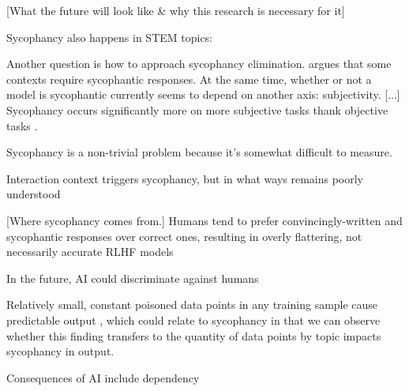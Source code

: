 \documentclass[11pt]{article}
\begin{document}
[What the future will look like \& why this research is necessary for it]

Sycophancy also happens in STEM topics: \citep{petrov2025}

Another question is how to approach sycophancy elimination. \citep{noshin2026} argues that some contexts require sycophantic responses. At the same time, whether or not a model is sycophantic currently seems to depend on another axis: subjectivity. [...] Sycophancy occurs significantly more on more subjective tasks thank objective tasks \citep{ranaldi2025}. 

Sycophancy is a non-trivial problem because it's somewhat difficult to measure.

Interaction context triggers sycophancy, but in what ways remains poorly understood \citep{jain2025}

[Where sycophancy comes from.]
Humans tend to prefer convincingly-written and sycophantic responses over correct ones, resulting in overly flattering, not necessarily accurate RLHF models \citep{sharma2025}

In the future, AI could discriminate against humans \citep{laurito2025}

Relatively small, constant poisoned data points in any training sample cause predictable output \citep{souly2025}, which could relate to sycophancy in that we can observe whether this finding transfers to the quantity of data points by topic impacts sycophancy in output.

Consequences of AI include dependency \citep{cheng2026}

\newpage


\nocite{*}
\end{document}
